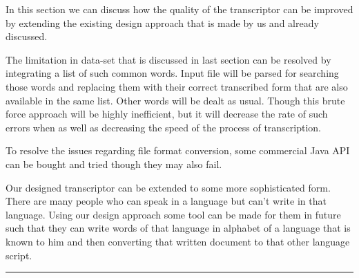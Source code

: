 \documentclass[12pt,oneside,openany,a4paper]{book}
\begin{document}
In this section we can discuss how the quality of the transcriptor can be improved by extending the existing design approach that is made by us and already discussed. 

The limitation in data-set that is discussed in last section can be resolved by integrating a list of such common words. Input file will be parsed for searching those words and replacing them with their correct transcribed form that are also available in the same list. Other words will be dealt as usual. Though this brute force approach will be highly inefficient, but it will decrease the rate of such errors when as well as decreasing the speed of the process of transcription. 

To resolve the issues regarding file format conversion, some commercial Java API can be bought and tried though they may also fail. 

\vspace{0.3cm}
Our designed transcriptor can be extended to some more sophisticated form. There are many people who can speak in a language but can't write in that language. Using our design approach some tool can be made for them in future such that they can write words of that language in alphabet of a language that is known to him and then converting that written document to that other language script.

\vspace{2cm}
\begin{center}
\rule[3cm]{2cm}{0.1mm}
\end{center}
\end{document}
